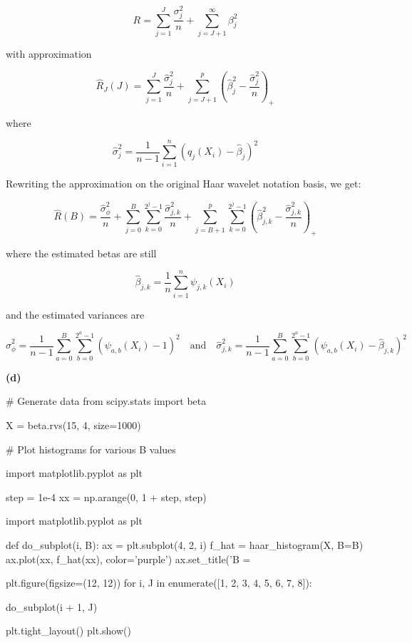 \[ R = \sum_{j=1}^J \frac{\sigma_j^2}{n} + \sum_{j=J+1}^\infty \beta_j^2 \]

with approximation

\[ \hat{R}_J(J) = \sum_{j=1}^J \frac{\hat{\sigma}_j^2}{n} + \sum_{j=J+1}^p \left( \hat{\beta}_j^2 - \frac{\hat{\sigma}_j^2}{n} \right)_{+} \]

where

\[ \hat{\sigma}_j^2 = \frac{1}{n - 1} \sum_{i=1}^n \left( q_j(X_i) - \hat{\beta}_j\right)^2 \]

Rewriting the approximation on the original Haar wavelet notation basis,
we get:

\[ \hat{R}(B) = \frac{\hat{\sigma}_\phi^2}{n} 
+ \sum_{j=0}^B \sum_{k=0}^{2^j - 1} \frac{\hat{\sigma}_{j, k}^2}{n}
+ \sum_{j=B+1}^p \sum_{k=0}^{2^j - 1} \left( \hat{\beta}_{j, k}^2 - \frac{\hat{\sigma}_{j, k}^2}{n} \right)_+
\]

where the estimated betas are still

\[ \hat{\beta}_{j, k} = \frac{1}{n} \sum_{i=1}^n \psi_{j, k} (X_i)\]

and the estimated variances are

\[ 
\hat{\sigma}_\phi^2 = \frac{1}{n - 1} \sum_{a=0}^B \sum_{b=0}^{2^a - 1} \left( \psi_{a, b}(X_i) - 1\right)^2
\quad \text{and} \quad
\hat{\sigma}_{j, k}^2 = \frac{1}{n - 1} \sum_{a=0}^B \sum_{b=0}^{2^a - 1} \left( \psi_{a, b}(X_i) - \hat{\beta}_{j, k}\right)^2 
\]

\textbf{(d)}

\begin{python}
# Generate data
from scipy.stats import beta

X = beta.rvs(15, 4, size=1000)
\end{python}

\begin{python}
# Plot histograms for various B values

import matplotlib.pyplot as plt

step = 1e-4
xx = np.arange(0, 1 + step, step)

import matplotlib.pyplot as plt

def do_subplot(i, B):
    ax = plt.subplot(4, 2, i)
    f_hat = haar_histogram(X, B=B)
    ax.plot(xx, f_hat(xx), color='purple')
    ax.set_title('B = %
    
plt.figure(figsize=(12, 12))
for i, J in enumerate([1, 2, 3, 4, 5, 6, 7, 8]):
    
    do_subplot(i + 1, J)

plt.tight_layout()
plt.show()
\end{python}

